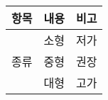 \documentclass[12pt]{article}
\begin{document}
	
	\begin{tabular}{ c | c | c }
		\hline
		항목 & 내용 & 비고 \\ 
		\hline  
		& 소형 & 저가 \\ \cline{2-3}
		종류 & 중형 & 권장 \\ \cline{2-3}
		& 대형 & 고가 \\ \hline
	\end{tabular}
	
\end{document}
